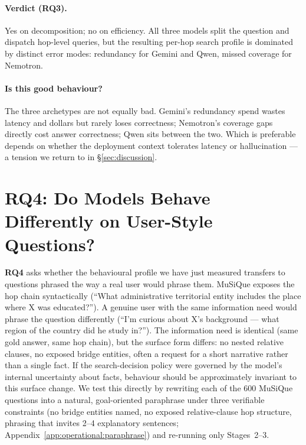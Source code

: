 \documentclass[10pt,letterpaper]{article}
\begin{document}
\paragraph{Verdict (RQ3).}
Yes on decomposition; no on efficiency. All three models split the question and
dispatch hop-level queries, but the resulting per-hop search profile is dominated by
distinct error modes: redundancy for Gemini and Qwen, missed coverage for Nemotron.

\paragraph{Is this good behaviour?}
The three archetypes are not equally bad. Gemini's redundancy spend wastes latency
and dollars but rarely loses correctness; Nemotron's coverage gaps directly cost
answer correctness; Qwen sits between the two. Which is preferable depends on whether
the deployment context tolerates latency or hallucination --- a tension we return to
in \S\ref{sec:discussion}.

\section{RQ4: Do Models Behave Differently on User-Style Questions?}\label{sec:paraphrase}

\textbf{RQ4} asks whether the behavioural profile we have just measured transfers to
questions phrased the way a real user would phrase them. MuSiQue exposes the hop chain
syntactically (``What administrative territorial entity includes the place where X was
educated?''). A genuine user with the same information need would phrase the question
differently (``I'm curious about X's background --- what region of the country did he
study in?''). The information need is identical (same gold answer, same hop chain),
but the surface form differs: no nested relative clauses, no exposed bridge entities,
often a request for a short narrative rather than a single fact. If the search-decision
policy were governed by the model's internal uncertainty about facts, behaviour should
be approximately invariant to this surface change. We test this directly by rewriting
each of the 600 MuSiQue questions into a natural, goal-oriented paraphrase under three
verifiable constraints (no bridge entities named, no exposed relative-clause hop
structure, phrasing that invites 2--4 explanatory sentences;
Appendix~\ref{app:operational:paraphrase}) and re-running only Stages~2--3.
\end{document}

